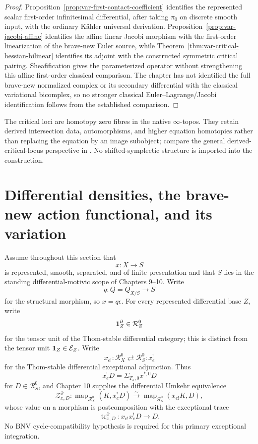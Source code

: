 \begin{proof}
Proposition~\ref{prop:var-first-contact-coefficient} identifies the represented scalar first-order infinitesimal differential, after taking \(\pi_0\) on discrete smooth input, with the ordinary K\"ahler universal derivation.  Proposition~\ref{prop:var-jacobi-affine} identifies the affine linear Jacobi morphism with the first-order linearization of the brave-new Euler source, while Theorem~\ref{thm:var-critical-hessian-bilinear} identifies its adjoint with the constructed symmetric critical pairing.  Sheafification gives the parameterized operator without strengthening this affine first-order classical comparison.  The chapter has not identified the full brave-new normalized complex or its secondary differential with the classical variational bicomplex, so no stronger classical Euler--Lagrange/Jacobi identification follows from the established comparison.
\end{proof}

\begin{remark}
\label{rem:var-derived-critical-literature}
The critical loci are homotopy zero fibres in the native \(\infty\)-topos. They retain derived intersection data, automorphisms, and higher equation homotopies rather than replacing the equation by an image subobject; compare the general derived-critical-locus perspective in \cite{Grataloup2020}. No shifted-symplectic structure is imported into the construction.
\end{remark}

\section{Differential densities, the brave-new action functional, and its variation}
\label{sec:var-action-functional}

Assume throughout this section that
\[
    x:X\longrightarrow S
\]
is represented, smooth, separated, and of finite presentation and that \(S\) lies in the standing differential-motivic scope of Chapters 9--10. Write
\[
    q:Q=Q_{X/S}\longrightarrow S
\]
for the structural morphism, so \(x=q\epsilon\). For every represented differential base \(Z\), write
\[
    \mathbf 1_Z^\partial\in\mathcal R_Z^0
\]
for the tensor unit of the Thom-stable differential category; this is distinct from the tensor unit \(\mathbf 1_Z\in\mathcal E_Z\). Write
\[
    x_{e!}:\mathcal R_X^0\rightleftarrows\mathcal R_S^0:x_e^!
\]
for the Thom-stable differential exceptional adjunction. Thus
\[
    x_e^!D=\Sigma_{T_x,0}x^{*,0}D
\]
for \(D\in\mathcal R_S^0\), and Chapter 10 supplies the differential Umkehr equivalence
\[
    \mathcal Z^\partial_{x,D}:
    \operatorname{map}_{\mathcal R_X^0}
    (K,x_e^!D)
    \xrightarrow{\sim}
    \operatorname{map}_{\mathcal R_S^0}
    (x_{e!}K,D),
\]
whose value on a morphism is postcomposition with the exceptional trace
\[
    \operatorname{tr}^\partial_{x,D}:
    x_{e!}x_e^!D\longrightarrow D.
\]
No BNV cycle-compatibility hypothesis is required for this primary exceptional integration.

